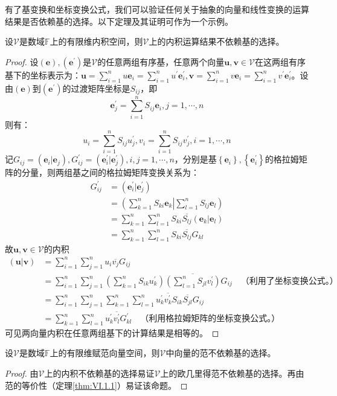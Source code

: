 \documentclass[main.tex]{subfiles}
\begin{document}
有了基变换和坐标变换公式，我们可以验证任何关于抽象的向量和线性变换的运算结果是否依赖基的选择。以下定理及其证明可作为一个示例。

\begin{theorem}\label{thm:II.2.22}
    设$\mathcal{V}$是数域$\mathbb{F}$上的有限维内积空间，则$\mathcal{V}$上的内积运算结果不依赖基的选择。
\end{theorem}
\begin{proof}
    设$\left(\mathbf{e}\right),\left(\mathbf{e}^\prime\right)$是$\mathcal{V}$的任意两组有序基，任意两个向量$\mathbf{u},\mathbf{v}\in\mathcal{V}$在这两组有序基下的坐标表示为：$\mathbf{u}=\sum_{i=1}^nu\mathbf{e}_i=\sum_{i=1}^nu^\prime\mathbf{e}^\prime_i,\mathbf{v}=\sum_{i=1}^nv\mathbf{e}_i=\sum_{i=1}^nv^\prime\mathbf{e}^\prime_i$。设由$\left(\mathbf{e}\right)$到$\left(\mathbf{e}^\prime\right)$的过渡矩阵坐标是$S_{ij}$，即
    \[
        \mathbf{e}_j^\prime=\sum_{i=1}^nS_{ij}\mathbf{e}_i,j=1,\cdots,n\]
    则有：
    \[u_i=\sum_{i=1}^nS_{ij}u^\prime_j,v_i=\sum_{i=1}^nS_{ij}v^\prime_j,i=1,\cdots,n\]
    记$G_{ij}=\left(\mathbf{e}_i|\mathbf{e}_j\right),G_{ij}^\prime=\left(\mathbf{e}^\prime_i|\mathbf{e}^\prime_j\right),i,j=1,\cdots,n$，分别是基$\left\{\mathbf{e}_i\right\},\left\{\mathbf{e}^\prime_i\right\}$的格拉姆矩阵的分量，则两组基之间的格拉姆矩阵变换关系为：
    \begin{align*}
        G^\prime_{ij} & =\left(\mathbf{e}^\prime_i|\mathbf{e}^\prime_j\right)                                     \\
                      & =\left(\sum_{k=1}^n S_{ki}\mathbf{e}_k\right|\left.\sum_{l=1}^n S_{lj}\mathbf{e}_l\right) \\
                      & =\sum_{k=1}^n\sum_{l=1}^nS_{ki}\overline{S_{lj}}\left(\mathbf{e}_k|\mathbf{e}_l\right)    \\
                      & =\sum_{k=1}^n\sum_{l=1}^nS_{ki}\overline{S_{lj}}G_{kl}
    \end{align*}
    故$\mathbf{u},\mathbf{v}\in\mathcal{V}$的内积
    \begin{align*}
        \left(\mathbf{u}|\mathbf{v}\right) & =\sum_{i=1}^n\sum_{j=1}^nu_i\overline{v_j}G_{ij}                                                                                                     \\
                                           & =\sum_{i=1}^n\sum_{j=1}^n\left(\sum_{k=1}^nS_{ik}u_k^\prime\right)\overline{\left(\sum_{l=1}^nS_{jl}v_l^\prime\right)}G_{ij}\quad\text{（利用了坐标变换公式。）} \\
                                           & =\sum_{i=1}^n\sum_{j=1}^n\sum_{k=1}^n\sum_{l=1}^nu_k^\prime\overline{v_k^\prime}S_{ik}\overline{S_{jl}}G_{ij}                                        \\
                                           & =\sum_{k=1}^n\sum_{l=1}^nu_k^\prime\overline{v_l^\prime}G_{kl}^\prime\quad\text{（利用格拉姆矩阵的坐标变换公式。）}
    \end{align*}
    可见两向量内积在任意两组基下的计算结果是相等的。
\end{proof}
\begin{corollary}
    设$\mathcal{V}$是数域$\mathbb{F}$上的有限维赋范向量空间，则$\mathcal{V}$中向量的范不依赖基的选择。
\end{corollary}
\begin{proof}
    由$\mathcal{V}$上的内积不依赖基的选择易证$\mathcal{V}$上的欧几里得范不依赖基的选择。再由范的等价性（定理\ref{thm:VI.1.1}）易证该命题。
\end{proof}
\end{document}
